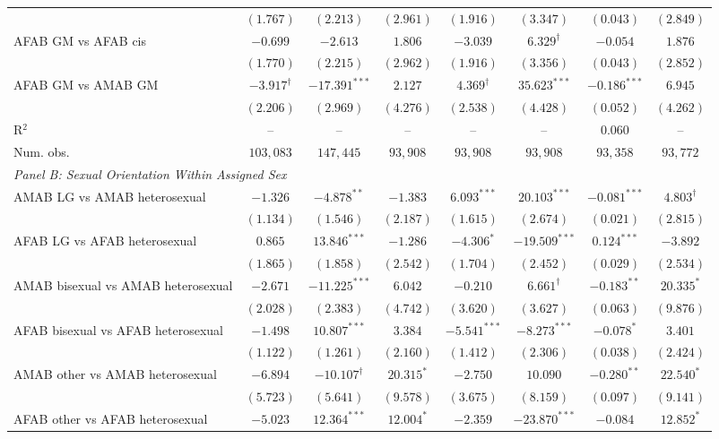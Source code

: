 \begin{table}[htpb!]
{\begin{tabular}{l c c c c c c c}
 & $(1.767)$ & $(2.213)$ & $(2.961)$ & $(1.916)$ & $(3.347)$ & $(0.043)$ & $(2.849)$ \\
AFAB GM vs AFAB cis & $-0.699$ & $-2.613$ & $1.806$ & $-3.039$ & $6.329^{\dagger}$ & $-0.054$ & $1.876$ \\
 & $(1.770)$ & $(2.215)$ & $(2.962)$ & $(1.916)$ & $(3.356)$ & $(0.043)$ & $(2.852)$ \\
AFAB GM vs AMAB GM & $-3.917^{\dagger}$ & $-17.391^{***}$ & $2.127$ & $4.369^{\dagger}$ & $35.623^{***}$ & $-0.186^{***}$ & $6.945$ \\
 & $(2.206)$ & $(2.969)$ & $(4.276)$ & $(2.538)$ & $(4.428)$ & $(0.052)$ & $(4.262)$ \\
\hline
R$^2$ & -- & -- & -- & -- & -- & $0.060$ & -- \\
Num. obs. & $103,083$ & $147,445$ & $93,908$ & $93,908$ & $93,908$ & $93,358$ & $93,772$ \\
\hline
\multicolumn{8}{l}{\textit{Panel B: Sexual Orientation Within Assigned Sex}} \\
AMAB LG vs AMAB heterosexual & $-1.326$ & $-4.878^{**}$ & $-1.383$ & $6.093^{***}$ & $20.103^{***}$ & $-0.081^{***}$ & $4.803^{\dagger}$ \\
 & $(1.134)$ & $(1.546)$ & $(2.187)$ & $(1.615)$ & $(2.674)$ & $(0.021)$ & $(2.815)$ \\
AFAB LG vs AFAB heterosexual & $0.865$ & $13.846^{***}$ & $-1.286$ & $-4.306^{*}$ & $-19.509^{***}$ & $0.124^{***}$ & $-3.892$ \\
 & $(1.865)$ & $(1.858)$ & $(2.542)$ & $(1.704)$ & $(2.452)$ & $(0.029)$ & $(2.534)$ \\
AMAB bisexual vs AMAB heterosexual & $-2.671$ & $-11.225^{***}$ & $6.042$ & $-0.210$ & $6.661^{\dagger}$ & $-0.183^{**}$ & $20.335^{*}$ \\
 & $(2.028)$ & $(2.383)$ & $(4.742)$ & $(3.620)$ & $(3.627)$ & $(0.063)$ & $(9.876)$ \\
AFAB bisexual vs AFAB heterosexual & $-1.498$ & $10.807^{***}$ & $3.384$ & $-5.541^{***}$ & $-8.273^{***}$ & $-0.078^{*}$ & $3.401$ \\
 & $(1.122)$ & $(1.261)$ & $(2.160)$ & $(1.412)$ & $(2.306)$ & $(0.038)$ & $(2.424)$ \\
AMAB other vs AMAB heterosexual & $-6.894$ & $-10.107^{\dagger}$ & $20.315^{*}$ & $-2.750$ & $10.090$ & $-0.280^{**}$ & $22.540^{*}$ \\
 & $(5.723)$ & $(5.641)$ & $(9.578)$ & $(3.675)$ & $(8.159)$ & $(0.097)$ & $(9.141)$ \\
AFAB other vs AFAB heterosexual & $-5.023$ & $12.364^{***}$ & $12.004^{*}$ & $-2.359$ & $-23.870^{***}$ & $-0.084$ & $12.852^{*}$ \\

\end{tabular}}
\end{table}
